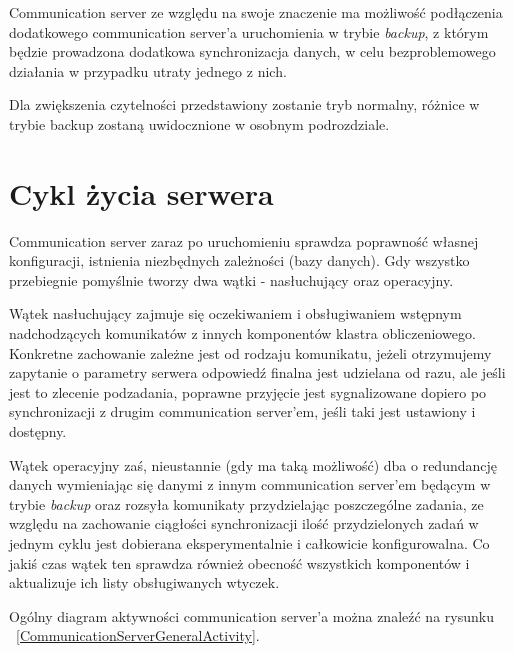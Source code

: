 \documentclass[12pt,a4paper,titlepage]{report}
\begin{document}
		Communication server ze względu na swoje znaczenie ma możliwość podłączenia dodatkowego
		communication server'a uruchomienia w trybie \textit{backup}, z którym będzie
		prowadzona dodatkowa synchronizacja danych, w celu bezproblemowego działania
		w przypadku utraty jednego z nich.
		
		Dla zwiększenia czytelności przedstawiony zostanie tryb normalny, różnice w trybie
		backup zostaną uwidocznione w osobnym podrozdziale.
		
		
	\section{Cykl życia serwera}
		Communication server zaraz po uruchomieniu sprawdza poprawność własnej konfiguracji,
		istnienia niezbędnych zależności (bazy danych). Gdy wszystko przebiegnie pomyślnie
		tworzy dwa wątki - nasłuchujący oraz operacyjny.
		
		Wątek nasłuchujący zajmuje się oczekiwaniem i obsługiwaniem wstępnym nadchodzących 
		komunikatów z innych komponentów klastra obliczeniowego. Konkretne zachowanie zależne
		jest od rodzaju komunikatu, jeżeli otrzymujemy zapytanie o parametry serwera
		odpowiedź finalna jest udzielana od razu, ale jeśli jest to zlecenie podzadania,
		poprawne przyjęcie jest sygnalizowane dopiero po synchronizacji z drugim communication server'em,
		jeśli taki jest ustawiony i dostępny.
		
		Wątek operacyjny zaś, nieustannie (gdy ma taką możliwość) dba o redundancję danych wymieniając 
		się danymi z innym communication server'em będącym w trybie \textit{backup} oraz rozsyła komunikaty 
		przydzielając poszczególne zadania,	ze względu na zachowanie ciągłości synchronizacji ilość 
		przydzielonych zadań w jednym cyklu jest dobierana eksperymentalnie i całkowicie konfigurowalna.
		Co jakiś czas wątek ten sprawdza również obecność wszystkich komponentów i aktualizuje ich listy
		obsługiwanych wtyczek. 
		
		Ogólny diagram aktywności communication server'a można znaleźć na rysunku 
		~\ref{CommunicationServerGeneralActivity}.
		
\end{document}
